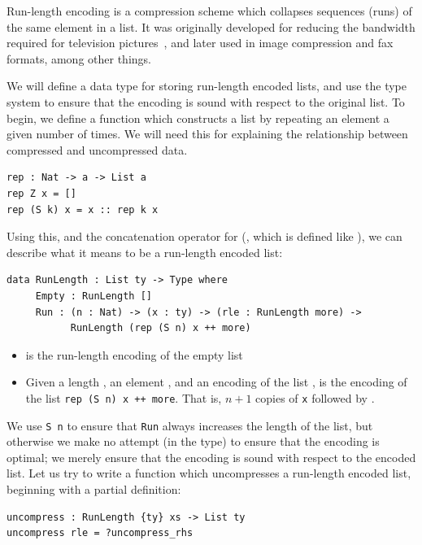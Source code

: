 Run-length encoding is a compression scheme which collapses sequences (runs)
of the same element in a list. It was originally developed for reducing the
bandwidth required for television pictures~\cite{rle}, and later used in
image compression and fax formats, among other things.

We will define a data type for storing run-length encoded lists, and use the
type system to ensure that the encoding is sound with respect to the
original list. To begin, we define a function which constructs a list by
repeating an element a given number of times. We will need this for
explaining the relationship between compressed and uncompressed data.

\begin{lstlisting}
rep : Nat -> a -> List a
rep Z x = []
rep (S k) x = x :: rep k x
\end{lstlisting}

Using this, and the concatenation operator for  (\FN{++}, which is
defined like ), we can describe what it means to be a run-length
encoded list:

\begin{lstlisting}
data RunLength : List ty -> Type where
     Empty : RunLength []
     Run : (n : Nat) -> (x : ty) -> (rle : RunLength more) ->
           RunLength (rep (S n) x ++ more)
\end{lstlisting}


\begin{itemize}
\item {} is the run-length encoding of the empty list \DC{[]}
\item Given a length , an element , and an encoding  of the
list ,     is the encoding
of the list \texttt{rep (S n) x ++ more}. That is, $n+1$ copies of \texttt{x}
followed by .
\end{itemize}

We use \texttt{S n} to ensure that \texttt{Run} always increases the length
of the list, but otherwise we make no attempt (in the type) to ensure that
the encoding is optimal; we merely ensure that the encoding is sound with
respect to the encoded list.
%
Let us try to write a function which uncompresses a run-length encoded list,
beginning with a partial definition:

\begin{lstlisting}
uncompress : RunLength {ty} xs -> List ty
uncompress rle = ?uncompress_rhs
\end{lstlisting}

